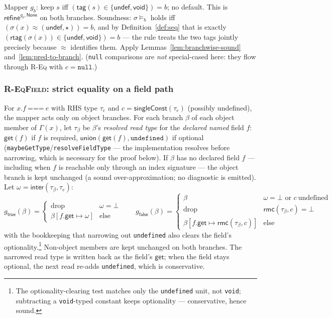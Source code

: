 \documentclass[11pt]{article}
\newcommand{\refineop}{\mathsf{refine}}
\newcommand{\tagfn}{\mathsf{tag}}
\newcommand{\rtag}{\mathsf{rtag}}
\newcommand{\Env}{\Gamma}
\begin{document}
Mapper $g_b$: keep $s$ iff
$(\tagfn(s) \in \{\mathsf{undef}, \mathsf{void}\}) = b$; no default. This is
$\refineop^{g_b,\mathsf{None}}$ on both branches.
Soundness: $\sigma \models_b$ holds iff
$(\sigma(x) \approx (\mathsf{undef},\star)) = b$, and by
Definition~\ref{def:seq} that is exactly
$(\rtag(\sigma(x)) \in \{\mathsf{undef},\mathsf{void}\}) = b$ — the rule
treats the two tags jointly precisely because $\approx$ identifies them.
Apply Lemmas~\ref{lem:branchwise-sound} and~\ref{lem:pred-to-branch}.
(\texttt{null} comparisons are \emph{not} special-cased here: they flow
through \textsc{R-Eq} with $c = \texttt{null}$.)

\subsubsection{\textsc{R-EqField}: strict equality on a field path}
\label{sec:r-eqfield}

For $x.f\ \texttt{===}\ e$ with RHS type $\tau_e$ and
$c = \mathsf{singleConst}(\tau_e)$ (possibly undefined), the mapper acts only
on object branches. For each branch $\beta$ of each object member of
$\Env(x)$, let $\tau_\beta$ be $\beta$'s \emph{resolved read type} for the
\emph{declared named} field $f$: $\mathsf{get}(f)$ if $f$ is required,
$\mathsf{union}(\mathsf{get}(f), \texttt{undefined})$ if optional
(\texttt{maybeGetType}/\texttt{resolveFieldType} — the implementation
resolves before narrowing, which is necessary for the proof below). If $\beta$ has no
declared field $f$ — including when $f$ is reachable only through an index
signature — the object branch is kept unchanged (a sound over-approximation; no
diagnostic is emitted). Let $\omega = \mathsf{inter}(\tau_\beta, \tau_e)$:
\[
g_{\mathsf{true}}(\beta) =
\begin{cases}
\text{drop} & \omega = \bot\\
\beta[f.\mathsf{get} \mapsto \omega] & \text{else}
\end{cases}
\qquad
g_{\mathsf{false}}(\beta) =
\begin{cases}
\beta & \omega = \bot \text{ or } c\ \text{undefined}\\
\text{drop} & \mathsf{rmc}(\tau_\beta, c) = \bot\\
\beta[f.\mathsf{get} \mapsto \mathsf{rmc}(\tau_\beta, c)] & \text{else}
\end{cases}
\]
with the bookkeeping that narrowing out \texttt{undefined} also clears the
field's optionality.\footnote{The optionality-clearing test matches only the
\texttt{undefined} unit, not \texttt{void}; subtracting a
\texttt{void}-typed constant keeps optionality — conservative, hence sound.}
Non-object members are kept unchanged on both branches. The narrowed read
type is written back as the field's $\mathsf{get}$; when the field stays
optional, the next read re-adds \texttt{undefined}, which is conservative.
\end{document}
